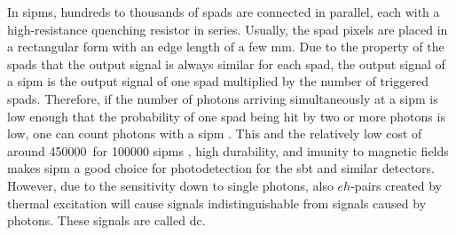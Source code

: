 In \acp{sipm}, hundreds to thousands of \acp{spad} are connected in parallel, each with a high-resistance quenching resistor in series. 
Usually, the \ac{spad} pixels are placed in a rectangular form with an edge length of a few \si{\milli\meter}.
Due to the property of the \acp{spad} that the output signal is always similar for each \ac{spad}, the output signal of a \ac{sipm} is the output signal of one \ac{spad} multiplied by the number of triggered \acp{spad}.
Therefore, if the number of photons arriving simultaneously at a \ac{sipm} is low enough that the probability of one \ac{spad} being hit by two or more photons is low, one can count photons with a \ac{sipm} \cite{ACERBI201916}.
This and the relatively low cost of around \num{450000}\,\texteuro{} for \num{100000} \acp{sipm} , high durability, and imunity to magnetic fields \cite{ACERBI201916,HamamatsuMPPCTech} makes \ac{sipm} a good choice for photodetection for the \ac{sbt} and similar detectors.
However, due to the sensitivity down to single photons, also $eh$-pairs created by thermal excitation will cause signals indistinguishable from signals caused by photons.
These signals are called \ac{dc}.






